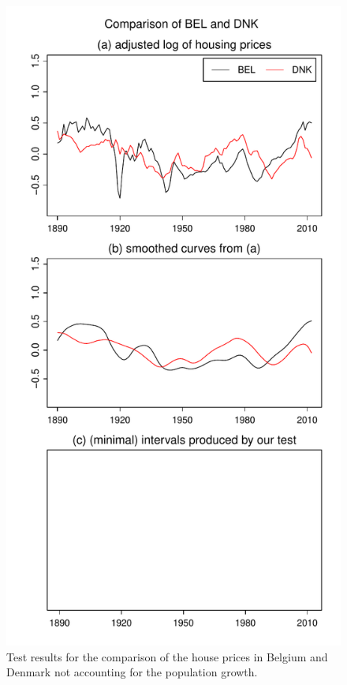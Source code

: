 \documentclass[a4paper,12pt]{article}
\begin{document}
\begin{enumerate}[label=\arabic*.,leftmargin=0.6cm]
\begin{figure}[p!]
\begin{minipage}[t]{0.48\textwidth}
\includegraphics[width=\textwidth]{output/BEL_vs_DNK}
\caption{Test results for the comparison of the house prices in Belgium and Denmark not accounting for the population growth.}\label{fig:hp:Belgium:Denmark}
\end{minipage}

\end{figure}
\end{enumerate}
\end{document}
